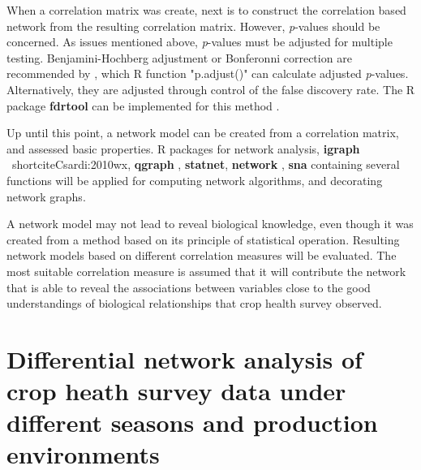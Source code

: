 When a correlation matrix was create, next is to construct the correlation based network from the resulting correlation matrix. However, \textit{p}-values should be concerned. As issues mentioned above, \textit{p}-values must be adjusted for multiple testing. Benjamini-Hochberg adjustment or Bonferonni correction are recommended by , which R function "p.adjust()" can calculate adjusted \textit{p}-values. Alternatively, they are adjusted through control of the false discovery rate. The R package \textbf{fdrtool} can be implemented for this method .

Up until this point, a network model can be created from a correlation matrix, and assessed basic properties. R packages for network analysis, \textbf{igraph} \ shortcite{Csardi:2010wx}, \textbf{qgraph} , \textbf{statnet}, \textbf{network} , \textbf{sna} containing several functions will be applied for  computing  network algorithms, and decorating network graphs.

A network model may not lead to reveal biological knowledge, even though it was created from a method based on its principle of statistical operation. Resulting network models based on different correlation measures will be evaluated. The most suitable correlation measure is assumed that it will contribute the network that is able to reveal the associations between variables close to the good understandings of biological relationships that crop health survey observed.  
\section*{Differential network analysis of crop heath survey data under different seasons and production environments}

